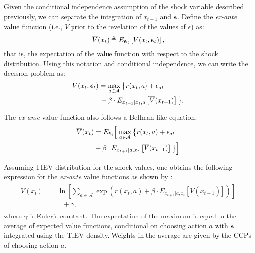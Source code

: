 \documentclass{article}
\renewcommand{\vec}[1]{\mbox{\bm{$#1$}}}
\begin{document}
Given the conditional independence assumption of the shock variable described previously, we can separate the integration of $x_{t+1}$ and $\vec{\epsilon}$. Define the \emph{ex-ante} value function (i.e., $V$ prior to the revelation of the values of $\epsilon$) as:
\begin{eqnarray}\label{eq:def_exante}
\overline{V}(x_t)
\triangleq 
E_{\vec{\epsilon}_t} \left[ V(x_t, \vec{\epsilon}_t) \right],
\end{eqnarray}
that is, the expectation of the value function with respect to the shock distribution. Using this notation and conditional independence, we can write the decision problem as:
%
\begin{align}
\begin{split}
V(x_t,\vec{\epsilon}_t) & =\max_{a\in\mathcal{A}} \big\{ \vphantom{V} r(x_t,a)+\epsilon_{at}  \\
&  \, +\beta \cdot E_{x_{t+1}|x_t,a} \left[ \overline{V}(x_{t+1}) \right] \vphantom{r(x_t, a)} \big\}.
\nonumber
\end{split}
\end{align}


The \emph{ex-ante} value function also follows a Bellman-like equation:
\begin{align} \label{eq:exantebellman}
\begin{split}
\overline{V}(x_t) & = E_{\vec{\epsilon}_t}\Big[\max_{a\in\mathcal{A}} \big\{r(x_t,a)+\epsilon_{at} \\
& +\beta  \cdot E_{x_{t+1}|a,x_t} \left[ \overline{V}(x_{t+1}) \right] \big\}\Big]
\end{split}
\end{align}

Assuming TIEV distribution for the shock values, one obtains the following expression for the \emph{ex-ante} value functions as shown by \cite{rust_gmc}:
\begin{align} \label{eq:exanterust}
\begin{split}
\overline{V}(x_t) &=\ln\left[\sum_{a\in\mathcal{A}} \exp\left(r(x_t,a)+\beta \cdot E_{x_{t+1}|a,x_t} \left[ \overline{V}(x_{t+1}) \right] \right)\right] \\
& \qquad +\gamma,
\end{split}
\end{align}
where $\gamma$ is Euler's constant. The expectation of the maximum is equal to the average of expected value functions, conditional on choosing action $a$ with $\vec{\epsilon}$ integrated using the TIEV density. Weights in the average are given by the CCPs of choosing action $a$.
\end{document}
